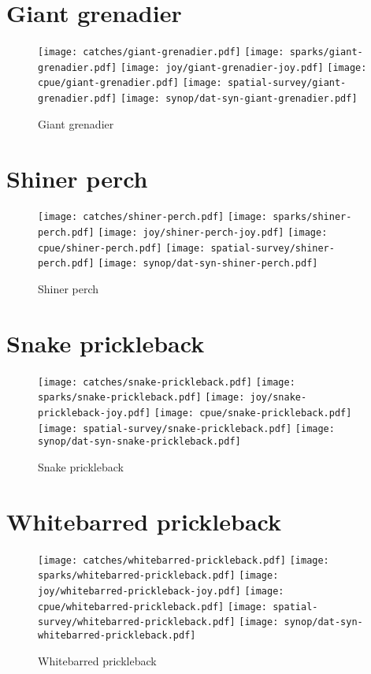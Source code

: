 \section*{Giant grenadier}

\begin{figure}[htbp]
\centering
\texttt{[image: catches/giant-grenadier.pdf]}
\texttt{[image: sparks/giant-grenadier.pdf]}
\texttt{[image: joy/giant-grenadier-joy.pdf]}
\texttt{[image: cpue/giant-grenadier.pdf]}
\texttt{[image: spatial-survey/giant-grenadier.pdf]}
\texttt{[image: synop/dat-syn-giant-grenadier.pdf]}
\caption{Giant grenadier}
\end{figure}
\clearpage
\section*{Shiner perch}

\begin{figure}[htbp]
\centering
\texttt{[image: catches/shiner-perch.pdf]}
\texttt{[image: sparks/shiner-perch.pdf]}
\texttt{[image: joy/shiner-perch-joy.pdf]}
\texttt{[image: cpue/shiner-perch.pdf]}
\texttt{[image: spatial-survey/shiner-perch.pdf]}
\texttt{[image: synop/dat-syn-shiner-perch.pdf]}
\caption{Shiner perch}
\end{figure}
\clearpage
\section*{Snake prickleback}

\begin{figure}[htbp]
\centering
\texttt{[image: catches/snake-prickleback.pdf]}
\texttt{[image: sparks/snake-prickleback.pdf]}
\texttt{[image: joy/snake-prickleback-joy.pdf]}
\texttt{[image: cpue/snake-prickleback.pdf]}
\texttt{[image: spatial-survey/snake-prickleback.pdf]}
\texttt{[image: synop/dat-syn-snake-prickleback.pdf]}
\caption{Snake prickleback}
\end{figure}
\clearpage
\section*{Whitebarred prickleback}

\begin{figure}[htbp]
\centering
\texttt{[image: catches/whitebarred-prickleback.pdf]}
\texttt{[image: sparks/whitebarred-prickleback.pdf]}
\texttt{[image: joy/whitebarred-prickleback-joy.pdf]}
\texttt{[image: cpue/whitebarred-prickleback.pdf]}
\texttt{[image: spatial-survey/whitebarred-prickleback.pdf]}
\texttt{[image: synop/dat-syn-whitebarred-prickleback.pdf]}
\caption{Whitebarred prickleback}
\end{figure}
\clearpage

